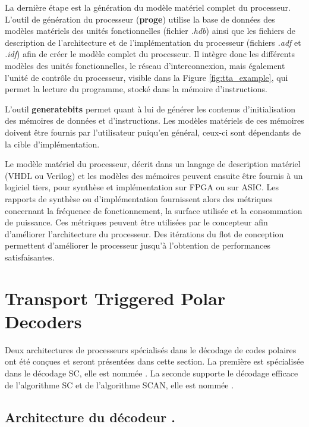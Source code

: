 La dernière étape est la génération du modèle matériel complet du processeur. L'outil de génération du processeur (\textbf{proge}) utilise la base de données des modèles matériels des unités fonctionnelles (fichier \textit{.hdb}) ainsi que les fichiers de description de l'architecture et de l'implémentation du processeur (fichiers \textit{.adf} et \textit{.idf}) afin de créer le modèle complet du processeur. Il intègre donc les différents modèles des unités fonctionnelles, le réseau d'interconnexion, mais également l'unité de contrôle du processeur, visible dans la Figure \ref{fig:tta_example}, qui permet la lecture du programme, stocké dans la mémoire d'instructions.

L'outil \textbf{generatebits} permet quant à lui de générer les contenus d'initialisation des mémoires de données et d'instructions. Les modèles matériels de ces mémoires doivent être fournis par l'utilisateur puiqu'en général, ceux-ci sont dépendants de la cible d'implémentation.

Le modèle matériel du processeur, décrit dans un langage de description matériel (VHDL ou Verilog) et les modèles des mémoires peuvent ensuite être fournis à un logiciel tiers, pour synthèse et implémentation sur FPGA ou sur ASIC. Les rapports de synthèse ou d'implémentation fournissent alors des métriques concernant la fréquence de fonctionnement, la surface utilisée et la consommation de puissance. Ces métriques peuvent être utilisées par le concepteur afin d'améliorer l'architecture du processeur. Des itérations du flot de conception permettent d'améliorer le processeur jusqu'à l'obtention de performances satisfaisantes.



\section{Transport Triggered Polar Decoders}
\label{sec:tta_design}

Deux architectures de processeurs spécialisés dans le décodage de codes polaires ont été conçues et seront présentées dans cette section. La première est spécialisée dans le décodage SC, elle est nommée \TTSC. La seconde supporte le décodage efficace de l'algorithme SC et de l'algorithme SCAN, elle est nommée \TTSCAN.

\subsection{Architecture du décodeur \TTSC.}

